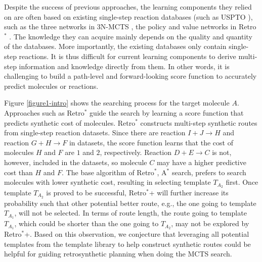 \documentclass[sn-mathphys,Numbered]{sn-jnl}
\begin{document}
Despite the success of previous approaches, the learning components they relied on are often based on existing single-step reaction databases (such as USPTO \citep{lowe2017}), such as the three networks in 3N-MCTS \citep{segler2018}, the policy and value networks in Retro$^*$ \citep{retro2020}. The knowledge they can acquire mainly depends on the quality and quantity of the databases.
More importantly, the existing databases only contain single-step reactions. 
It is thus difficult for current learning components to derive multi-step information and knowledge directly from them. In other words, it is challenging to build a path-level and forward-looking score function to accurately predict molecules or reactions.


Figure \ref{figure1-intro} shows the searching process for the target molecule $A$. Approaches such as Retro$^*$ guide the search by learning a score function that predicts synthetic cost of molecules. Retro$^*$ constructs multi-step synthetic routes from single-step reaction datasets. Since there are reaction $I+J \rightarrow H$ and reaction $G+H \rightarrow F$ in datasets, the score function learns that the cost of molecules $H$ and $F$ are $1$ and $2$, respectively. Reaction $D+E \rightarrow C$ is not, however, included in the datasets, so molecule $C$ may have a higher predictive cost than $H$ and $F$. The base algorithm of Retro$^*$, A$^*$ search, prefers to search molecules with lower synthetic cost, resulting in selecting template $T_{A_2}$ first. Once template $T_{A_2}$ is proved to be successful, Retro$^*$+ will further increase its probability such that other potential better route, e.g., the one going to template $T_{A_1}$, will not be selected.
In terms of route length, the route going to template $T_{A_1}$, which could be shorter than the one going to $T_{A_2}$, may not be explored by Retro$^*$+.
Based on this observation, we conjecture that leveraging all potential templates from the template library to help construct synthetic routes could be helpful for guiding retrosynthetic planning when doing the MCTS search.
\end{document}

